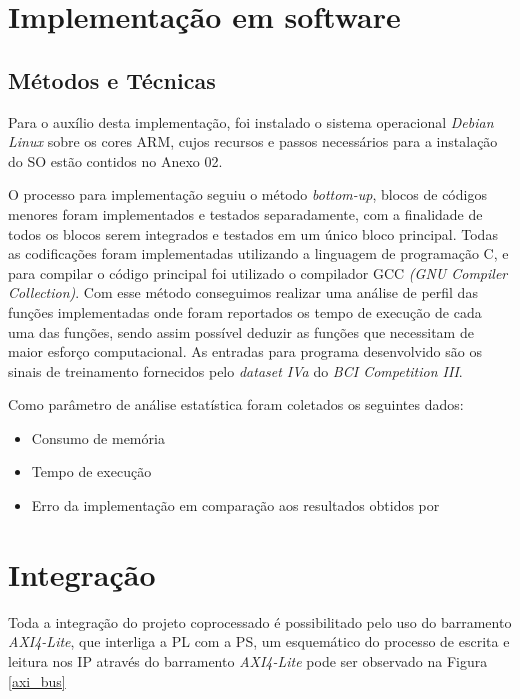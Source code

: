 \section{Implementação em software}

\subsection{Métodos e Técnicas}
Para o auxílio desta implementação, foi instalado o sistema operacional \textit{Debian Linux} sobre os cores ARM, cujos recursos e passos necessários
para a instalação do SO estão contidos no Anexo 02.

O processo para implementação seguiu o método \textit{bottom-up}, blocos de códigos menores foram implementados e testados separadamente, com a finalidade de todos os blocos serem integrados e testados em um único bloco principal. Todas as codificações foram implementadas utilizando a linguagem de programação C, e para compilar o código principal foi utilizado o compilador GCC \textit{(GNU Compiler Collection)}. Com esse método conseguimos realizar uma análise de perfil das funções implementadas onde foram reportados os tempo de execução de cada uma das funções, sendo assim possível deduzir as funções que necessitam de maior esforço computacional. As entradas para programa desenvolvido são os sinais de treinamento fornecidos pelo \textit{dataset IVa} do \textit{BCI Competition III}.

Como parâmetro de análise estatística foram coletados os seguintes dados:

\begin{itemize}[noitemsep]
\item Consumo de memória
\item Tempo de execução
\item Erro da implementação em comparação aos resultados obtidos por \cite{F.Lotte}
\end{itemize}

\section{Integração}
Toda a integração do projeto coprocessado é possibilitado pelo uso do barramento \textit{AXI4-Lite}, que interliga a PL com a PS, 
um esquemático do processo de escrita e leitura nos IP através do barramento \textit{AXI4-Lite} pode ser observado na Figura \ref{axi_bus}
\newpage

